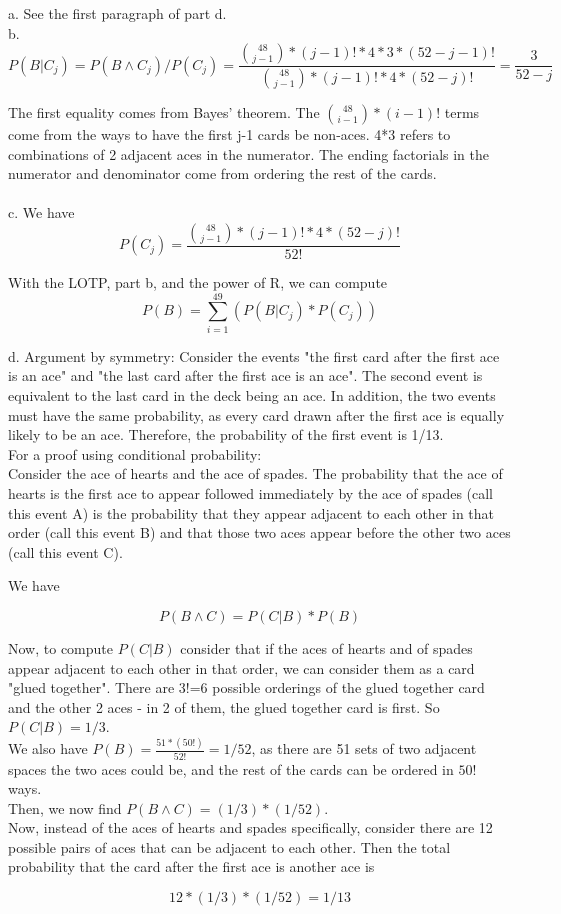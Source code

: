 a. See the first paragraph of part d.\\

b. \[P(B|C_{j}) = P(B \wedge C_{j})/P(C_{j}) = \frac{{48 \choose j-1}*(j-1)!*4*3*(52-j-1)!}{{48 \choose j-1}*(j-1)!*4*(52-j)!} = \frac{3}{52-j}\]

The first equality comes from Bayes' theorem. The \({48 \choose i-1}*(i-1)!\) terms come from the ways to have the first j-1 cards be non-aces. 4*3 refers to combinations of 2 adjacent aces in the numerator. The ending factorials in the numerator and denominator come from ordering the rest of the cards.
\\\\
c. We have \[P(C_{j}) = \frac{{48 \choose j-1}*(j-1)!*4*(52-j)!}{52!} \]


With the LOTP, part b, and the power of R, we can compute \[P(B) = \sum_{i=1}^{49}(P(B|C_{j})*P(C_{j}))\]

d. Argument by symmetry: Consider the events "the first card after the first ace is an ace" and "the last card after the first ace is an ace". The second event is equivalent to the last card in the deck being an ace. In addition, the two events must have the same probability, as every card drawn after the first ace is equally likely to be an ace. Therefore, the probability of the first event is 1/13.\\

For a proof using conditional probability: \\

Consider the ace of hearts and the ace of spades. The probability that the ace of hearts is the first ace to appear followed immediately by the ace of spades (call this event A) is the probability that they appear adjacent to each other in that order (call this event B) and that those two aces appear before the other two aces (call this event C).

We have 

\[P(B \wedge C) = P(C|B)*P(B)\]

Now, to compute \(P(C|B)\) consider that if the aces of hearts and of spades appear adjacent to each other in that order, we can consider them as a card "glued together". There are 3!=6 possible orderings of the glued together card and the other 2 aces - in 2 of them, the glued together card is first. So \(P(C|B) = 1/3\).\\

We also have \(P(B) = \frac{51*(50!)}{52!} = 1/52\), as there are 51 sets of two adjacent spaces the two aces could be, and the rest of the cards can be ordered in \(50!\) ways. \\

Then, we now find \(P(B \wedge C) = (1/3)*(1/52)\). \\

Now, instead of the aces of hearts and spades specifically, consider there are 12 possible pairs of aces that can be adjacent to each other. Then the total probability that the card after the first ace is another ace is 

\[12*(1/3)*(1/52) = 1/13\]
